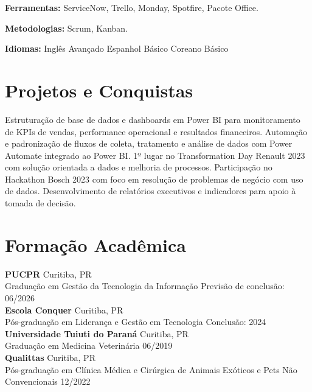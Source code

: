 \documentclass[11pt,a4paper]{article}
\begin{document}
\textbf{Ferramentas:} ServiceNow, Trello, Monday, Spotfire, Pacote Office.

\textbf{Metodologias:} Scrum, Kanban.

\textbf{Idiomas:} Inglês Avançado \enspace\textbullet\enspace Espanhol Básico \enspace\textbullet\enspace Coreano Básico

\section{Projetos e Conquistas}

Estruturação de base de dados e dashboards em Power BI para monitoramento de KPIs de vendas, performance operacional e resultados financeiros. Automação e padronização de fluxos de coleta, tratamento e análise de dados com Power Automate integrado ao Power BI. 1º lugar no Transformation Day Renault 2023 com solução orientada a dados e melhoria de processos. Participação no Hackathon Bosch 2023 com foco em resolução de problemas de negócio com uso de dados. Desenvolvimento de relatórios executivos e indicadores para apoio à tomada de decisão.

\section{Formação Acadêmica}

\textbf{PUCPR} \hfill Curitiba, PR\\
Graduação em Gestão da Tecnologia da Informação \hfill Previsão de conclusão: 06/2026\\[6pt]

\textbf{Escola Conquer} \hfill Curitiba, PR\\
Pós-graduação em Liderança e Gestão em Tecnologia \hfill Conclusão: 2024\\[6pt]

\textbf{Universidade Tuiuti do Paraná} \hfill Curitiba, PR\\
Graduação em Medicina Veterinária \hfill 06/2019\\[6pt]

\textbf{Qualittas} \hfill Curitiba, PR\\
Pós-graduação em Clínica Médica e Cirúrgica de Animais Exóticos e Pets Não Convencionais \hfill 12/2022
\end{document}
